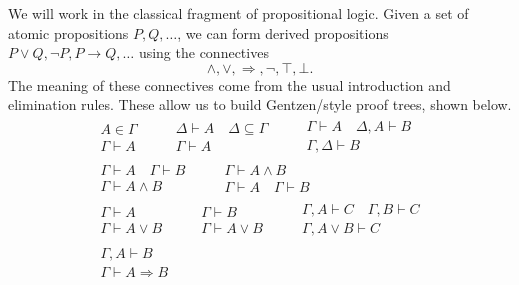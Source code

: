 \documentclass[../main.tex]{subfiles}
\begin{document}
We will work in the classical fragment of propositional logic. Given a set of
atomic propositions \(P,Q,\ldots\), we can form derived propositions \(P \vee Q,
\neg P, P \to Q,\ldots\) using the connectives
\[%
  \wedge, \vee, \Rightarrow, \neg, \top, \bot.
\]%
The meaning of these connectives come from the usual introduction and
elimination rules. These allow us to build Gentzen\-/style proof trees, shown
below.
\begin{gather*}
  \begin{array}{c}
    A \in \Gamma \\\hline \Gamma \vdash A
  \end{array}\quad\quad
  \begin{array}{c}
    \Delta \vdash A \quad \Delta \subseteq \Gamma \\\hline \Gamma \vdash A
  \end{array}\quad\quad
  \begin{array}{c}
    \Gamma \vdash A \quad \Delta, A \vdash B\\\hline \Gamma,\Delta \vdash B
  \end{array}\\
  \begin{array}{c}
    \Gamma \vdash A \quad \Gamma \vdash B \\\hline \Gamma \vdash A \wedge B
  \end{array}\quad\quad
  \begin{array}{c}
    \Gamma \vdash A \wedge B \\\hline \Gamma \vdash A \quad \Gamma \vdash B
  \end{array}\\
  \begin{array}{c}
    \Gamma \vdash A \\\hline \Gamma \vdash A \vee B
  \end{array}\quad\quad
  \begin{array}{c}
    \Gamma \vdash B \\\hline \Gamma \vdash A \vee B
  \end{array}\quad\quad
  \begin{array}{c}
    \Gamma, A \vdash C \quad \Gamma, B \vdash C \\\hline \Gamma, A \vee B \vdash C
  \end{array}\\
  \begin{array}{c}
    \Gamma, A \vdash B \\\hline \Gamma \vdash A \Rightarrow B
  \end{array}\quad\quad

\end{gather*}
\end{document}
